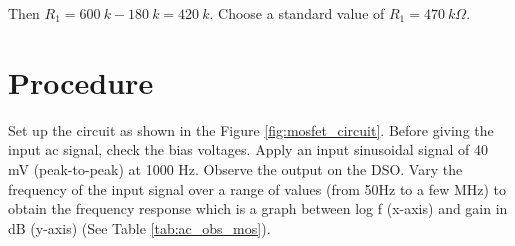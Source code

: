 \begin{enumerate}
	Then $R_1=600\ k-180\ k= 420\ k$. Choose a standard value of $R_1=470\ k\Omega$. 
\end{enumerate}

\section{Procedure}
Set up the circuit as shown in the Figure \ref{fig:mosfet_circuit}. Before giving the input ac signal, check the bias voltages. Apply an input sinusoidal signal of 40 mV (peak-to-peak) at 1000 Hz. Observe the output on the DSO. Vary the frequency of the input signal over a range of values (from 50Hz to a few MHz) to obtain the frequency response which is a graph between log f (x-axis) and gain in dB (y-axis) (See Table 	\ref{tab:ac_obs_mos}).

